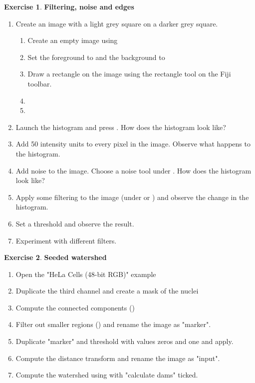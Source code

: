\documentclass[xcolor=table,DIV=19,twocolumn]{scrartcl}
\theoremstyle{definition}
\newtheorem{exercice}{Exercise}
\begin{document}
\begin{exercice} \textbf{Filtering, noise and edges}
  \begin{enumerate}
     \item Create an image with a light grey square on a darker grey
      square.
      \begin{enumerate}
          \item Create an empty image using 
          \item {} Set the foreground to  and the background to 
          \item Draw a rectangle on the image using the rectangle tool on the Fiji toolbar.
          \item {}
          \item {}
      \end{enumerate}
    \item Launch the histogram and press . How does the histogram look like?
    \item Add 50 intensity units to every pixel in the image.   Observe what happens to the histogram.
    \item Add noise to the image. Choose a noise tool under   . How does the histogram look like?
    \item Apply some filtering to the image (under  or ) and observe the change in the histogram.
    \item Set a threshold and observe the result.
    \item  Experiment with different filters.
  \end{enumerate}
\end{exercice}

\begin{exercice} \textbf{Seeded watershed}
  \begin{enumerate}
    \item Open the "HeLa Cells (48-bit RGB)" example
    \item Duplicate the third channel and create a mask of the nuclei
    \item Compute the connected components ()
    \item Filter out smaller regions () and rename the image as "marker".
    \item Duplicate "marker" and threshold with values zeros and one and apply.
    \item Compute the distance transform  and rename the image as "input".
    \item Compute the watershed using  with "calculate dams" ticked.
  \end{enumerate}
\end{exercice}
\end{document}
